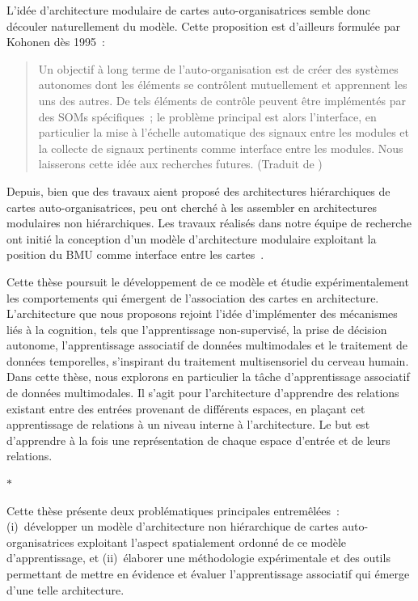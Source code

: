 L'idée d'architecture modulaire de cartes auto-organisatrices semble donc découler naturellement du modèle. Cette proposition est d'ailleurs formulée par Kohonen dès 1995~:
\begin{quote}
\og Un objectif à long terme de l'auto-organisation est de créer des systèmes autonomes dont les éléments se contrôlent mutuellement et apprennent les uns des autres. De tels éléments de contrôle peuvent être implémentés par des SOMs spécifiques~; le problème principal est alors l'interface, en particulier la mise à l'échelle automatique des signaux entre les modules et la collecte de signaux pertinents comme interface entre les modules. Nous laisserons cette idée aux recherches futures. \fg{}
(Traduit de \cite{Kohonen1995SelfOrganizingM})
\end{quote}

Depuis, bien que des travaux aient proposé des architectures hiérarchiques de cartes auto-organisatrices, peu ont cherché à les assembler en architectures modulaires non hiérarchiques. 
Les travaux réalisés dans notre équipe de recherche ont initié la conception d'un modèle d'architecture modulaire exploitant la position du BMU comme interface entre les cartes~\parencite{baheux_towards_2014}.

Cette thèse poursuit le développement de ce modèle et étudie expérimentalement les comportements qui émergent de l'association des cartes en architecture.
L'architecture que nous proposons rejoint l'idée d'implémenter des mécanismes liés à la cognition, tels que l'apprentissage non-supervisé, la prise de décision autonome, l'apprentissage associatif de données multimodales et le traitement de données temporelles, s'inspirant du traitement multisensoriel du cerveau humain. 
Dans cette thèse, nous explorons en particulier la tâche d'apprentissage associatif de données multimodales.
Il s'agit pour l'architecture d'apprendre des relations existant entre des entrées provenant de différents espaces, en plaçant cet apprentissage de relations à un niveau interne à l'architecture. Le but est d'apprendre à la fois une représentation de chaque espace d'entrée et de leurs relations.

\begin{center}
  $\ast$
\end{center}

Cette thèse présente deux problématiques principales entremêlées~: (i)~développer un modèle d'architecture non hiérarchique de cartes auto-organisatrices exploitant l'aspect spatialement ordonné de ce modèle d'apprentissage, et (ii)~élaborer une méthodologie expérimentale et des outils permettant de mettre en évidence et évaluer l'apprentissage associatif qui émerge d'une telle architecture.

